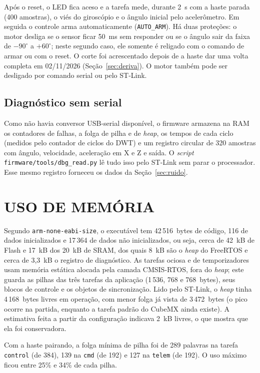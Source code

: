 Após o reset, o LED fica aceso e a tarefa mede, durante 2~s com a haste parada (400 amostras), o viés do giroscópio e o ângulo inicial pelo acelerômetro. Em seguida o controle arma automaticamente (\texttt{AUTO\_ARM}). Há duas proteções: o motor desliga se o sensor ficar 50~ms sem responder ou se o ângulo sair da faixa de $-90^\circ$ a $+60^\circ$; neste segundo caso, ele somente é religado com o comando de armar ou com o reset. O corte foi acrescentado depois de a haste dar uma volta completa em 02/11/2026 (Seção~\ref{sec:deriva}). O motor também pode ser desligado por comando serial ou pelo ST-Link.

\subsection{Diagnóstico sem serial}

Como não havia conversor USB-serial disponível, o firmware armazena na RAM os contadores de falhas, a folga de pilha e de \textit{heap}, os tempos de cada ciclo (medidos pelo contador de ciclos do DWT) e um registro circular de 320 amostras com ângulo, velocidade, aceleração em X e Z e saída. O \textit{script} \texttt{firmware/tools/dbg\_read.py} lê tudo isso pelo ST-Link sem parar o processador. Esse mesmo registro forneceu os dados da Seção~\ref{sec:ruido}.

\section{USO DE MEMÓRIA}

Segundo \texttt{arm-none-eabi-size}, o executável tem 42\,516~bytes de código, 116 de dados inicializados e 17\,364 de dados não inicializados, ou seja, cerca de 42~kB de Flash e 17~kB dos 20~kB de SRAM, dos quais 8~kB são o \textit{heap} do FreeRTOS e cerca de 3,3~kB o registro de diagnóstico. As tarefas ociosa e de temporizadores usam memória estática alocada pela camada CMSIS-RTOS, fora do \textit{heap}; este guarda as pilhas das três tarefas da aplicação (1\,536, 768 e 768~bytes), seus blocos de controle e os objetos de sincronização. Lido pelo ST-Link, o \textit{heap} tinha 4\,168~bytes livres em operação, com menor folga já vista de 3\,472~bytes (o pico ocorre na partida, enquanto a tarefa padrão do CubeMX ainda existe). A estimativa feita a partir da configuração indicava 2~kB livres, o que mostra que ela foi conservadora.

Com a haste pairando, a folga mínima de pilha foi de 289 palavras na tarefa \texttt{control} (de 384), 139 na \texttt{cmd} (de 192) e 127 na \texttt{telem} (de 192). O uso máximo ficou entre 25\% e 34\% de cada pilha.

